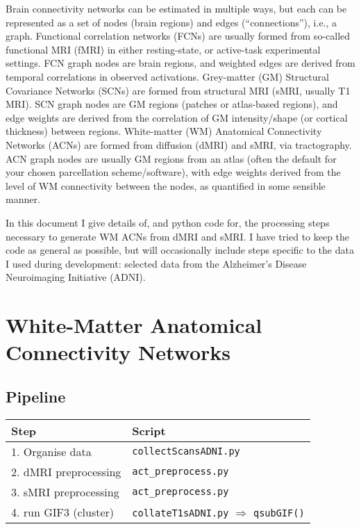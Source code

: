 \documentclass[12pt]{elsarticle}
\begin{document}
Brain connectivity networks can be estimated in multiple ways, but each can be represented as a set of nodes (brain regions) and edges (``connections''), i.e., a graph. 
Functional correlation networks (FCNs) are usually formed from so-called functional MRI (fMRI) in either resting-state, or active-task experimental settings. FCN graph nodes are brain regions, and weighted edges are derived from temporal correlations in observed activations. 
Grey-matter (GM) Structural Covariance Networks (SCNs) are formed from structural MRI (sMRI, usually T1 MRI). SCN graph nodes are GM regions (patches or atlas-based regions), and edge weights are derived from the correlation of GM intensity/shape (or cortical thickness) between regions.
White-matter (WM) Anatomical Connectivity Networks (ACNs) are formed from diffusion (dMRI) and sMRI, via tractography. ACN graph nodes are usually GM regions from an atlas (often the default for your chosen parcellation scheme/software), with edge weights derived from the level of WM connectivity between the nodes, as quantified in some sensible manner.

In this document I give details of, and python code for, the processing steps necessary to generate WM ACNs from dMRI and sMRI. 
I have tried to keep the code as general as possible, but will occasionally include steps specific to the data I used during development: selected data from the Alzheimer's Disease Neuroimaging Initiative (ADNI).

\section{White-Matter Anatomical Connectivity Networks}
\subsection{Pipeline}\label{sub:pipeline}
\begin{table}[!ht]
	\begin{center}
	\begin{tabular}{l|l}
		Step                  & Script                     \\ \hline\hline
		1. Organise data      & \verb|collectScansADNI.py| \\
		2. dMRI preprocessing & \verb|act_preprocess.py|   \\
		3. sMRI preprocessing & \verb|act_preprocess.py|   \\
		4. run GIF3 (cluster) & \verb|collateT1sADNI.py| $\Rightarrow$ \verb|qsubGIF()|   \\
	\end{tabular}
	\end{center}
	\label{label}
\end{table}
\end{document}
